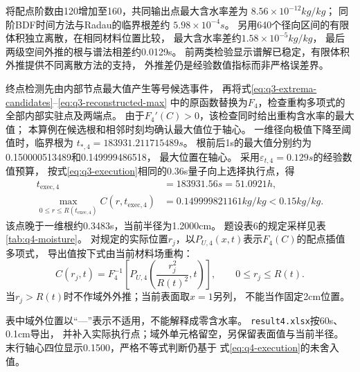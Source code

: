 将配点阶数由120增加至160，共同输出点最大含水率差为
$8.56\times10^{-12}\unit{kg/kg}$；
同阶BDF时间方法与Radau的临界根差约
$5.98\times10^{-4}\unit{s}$。
另用640个径向区间的有限体积独立离散，在相同材料位置比较，
最大含水率差约$1.58\times10^{-5}\unit{kg/kg}$，
最后两级空间外推的根与谱法相差约0.0129\unit{s}。
前两类检验显示谱解已稳定，有限体积外推提供不同离散方法的支持，
外推差仍是经验数值指标而非严格误差界。

终点检测先由内部节点最大值产生等号候选事件，
再将式\eqref{eq:q3-extrema-candidates}--\eqref{eq:q3-reconstructed-max}
中的原函数替换为$F_4$，检查重构多项式的全部内部实驻点及两端点。
由于$F_4'(C)>0$，该检查同时给出重构含水率的最大值；
本算例在候选根和相邻时刻均确认最大值位于轴心。
一维径向极值下降至阈值时，临界根为
$t_{*,4}=183931.211715489\unit{s}$。
根前后1\unit{s}的最大值分别约为0.150000513489和0.149999486518，
最大位置在轴心。
采用$\varepsilon_{t,4}=0.129\unit{s}$的经验数值预算，
按式\eqref{eq:q3-execution}相同的0.36\unit{s}量子向上选择执行点，得
\begin{equation}
 \begin{aligned}
  t_{\mathrm{exec},4}&=183931.56\unit{s}
      =\boxed{51.0921\unit{h}},\\
  \max_{0\le r\le R(t_{\mathrm{exec},4})}C(r,t_{\mathrm{exec},4})
      &=0.149999821161\unit{kg/kg}<0.15\unit{kg/kg}.
 \end{aligned}
 \label{eq:q4-execution}
\end{equation}
该点晚于一维根约0.3483\unit{s}，当前半径为1.2000\unit{cm}。
题设表6的规定采样见表\ref{tab:q4-moisture}。
对规定的实际位置$r_j$，以$P_{U,4}(x,t)$表示$F_4(C)$的配点插值多项式，
导出值按下式由当前材料场重构：
\begin{equation}
 C(r_j,t)=F_4^{-1}\!\left[
 P_{U,4}\!\left(\frac{r_j^2}{R(t)^2},t\right)\right],
 \qquad 0\le r_j\le R(t).
 \label{eq:q4-output-map}
\end{equation}
当$r_j>R(t)$时不作域外外推；当前表面取$x=1$另列，
不能当作固定2\unit{cm}位置。

\begin{table}[H]
 \centering
 \caption{题设表6：收缩过程中的干基含水率（\unit{kg/kg}）}
 \label{tab:q4-moisture}
 \small
 
\end{table}

表中域外位置以“—”表示不适用，不能解释成零含水率。
\texttt{result4.xlsx}按60\unit{s}、0.1\unit{cm}导出，
并补入实际执行点；域外单元格留空，另保留表面值与当前半径。
末行轴心四位显示0.1500，严格不等式判断仍基于
式\eqref{eq:q4-execution}的未舍入值。

